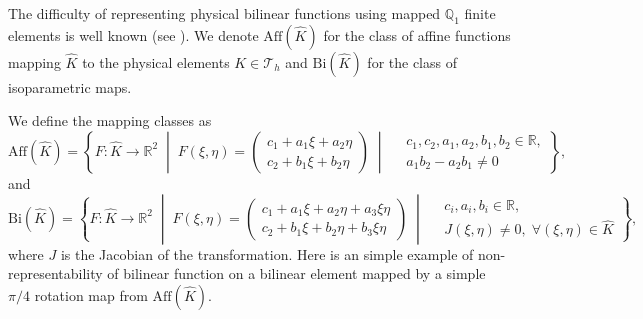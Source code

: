 \documentclass[a4paper]{article}
\theoremstyle{plain}
\theoremstyle{definition}
\theoremstyle{remark}
\begin{document}
The difficulty of representing physical bilinear functions using mapped \(\mathbb Q_1\) finite elements is well known (see \cite{ABF02}). We denote $\text{Aff}(\hat{K})$ for the class of affine functions mapping $\hat{K}$ to the physical elements $K \in \mathcal{T}_h $ and $\text{Bi}(\hat{K})$ for the class of isoparametric maps. 

We define the mapping classes as
\begin{equation}
\text{Aff}(\hat{K}) = \left\{ F: \hat{K} \to \mathbb{R}^2 \;\middle|\; F(\xi, \eta) = \begin{pmatrix} c_1 + a_1\xi + a_2\eta \\ c_2 + b_1\xi + b_2\eta \end{pmatrix} \;\middle|\;
\begin{aligned}
	&c_1, c_2, a_1, a_2, b_1, b_2 \in \mathbb{R}, \\
	&a_1 b_2 - a_2 b_1 \neq 0
\end{aligned} \right\},
	\label{eq:Aff_map_class}
\end{equation}
and
\begin{equation}
	\text{Bi}(\hat{K}) = \left\{ F: \hat{K} \to \mathbb{R}^2 \;\middle|\; F(\xi, \eta) = \begin{pmatrix} c_1 + a_1\xi + a_2\eta + a_3\xi\eta \\ c_2 + b_1\xi + b_2\eta + b_3\xi\eta \end{pmatrix} \;\middle|\;
	\begin{aligned}
		&c_i, a_i, b_i \in \mathbb{R}, \\
		&J(\xi,\eta) \neq 0, \; \forall (\xi,\eta) \in \hat{K}
	\end{aligned} \right\},
	\label{eq:Bi_map_class}
\end{equation}
where $J$ is the Jacobian of the transformation.  Here is an simple example of non-representability of bilinear function on a bilinear element mapped by a simple $\pi/4$ rotation map from $ \text{Aff}(\hat{K})$.  
\end{document}
